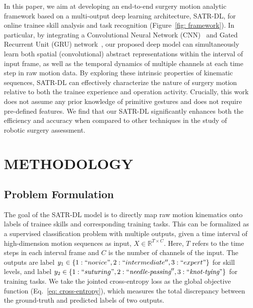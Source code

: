 \documentclass[letterpaper, 10 pt, conference, twoside]{IEEEtran}
\begin{document}
In this paper, we aim at developing an end-to-end surgery motion analytic framework based on a multi-output deep learning architecture, SATR-DL, for online trainee skill analysis and task recognition (Figure~\ref{fig: framework}). In particular, by integrating a Convolutional Neural Network (CNN)~\cite{szegedy2015going} and Gated Recurrent Unit (GRU) network~\cite{chung2014empirical}, our proposed deep model can simultaneously learn both spatial (convolutional) abstract representations within the interval of input frame, as well as the temporal dynamics of multiple channels at each time step in raw motion data.
By exploring these intrinsic properties of kinematic sequences, SATR-DL can effectively characterize the nature of surgery motion relative to both the trainee experience and operation activity. 
Crucially, this work does not assume any prior knowledge of primitive gestures and does not require pre-defined features.
We find that our SATR-DL significantly enhances both the efficiency and accuracy when compared to other techniques in the study of robotic surgery assessment.   
  
\section{METHODOLOGY}
\subsection{Problem Formulation}

The goal of the SATR-DL model is to directly map raw motion kinematics onto labels of trainee skills and corresponding training tasks. This can be formalized as a supervised classification problem with multiple outputs, given a time interval of high-dimension motion sequences as input, $X\in\mathbb{R}^{T\times C}$. Here, $T$ refers to the time steps in each interval frame and $C$ is the number of channels of the input. The outputs are label $y_1 \in \{1 :``novice", 2:``intermediate'', 3 :``expert" \}$ for skill levels, and label $y_2 \in \{1 :``suturing", 2:``\textit{needle-passing}'', 3 :``\textit{knot-tying}" \}$ for training tasks. 
We take the jointed cross-entropy loss as the global objective function (Eq.~\ref{eq: cross-entropy}), which measures the total discrepancy between the ground-truth and predicted labels of two outputs.

\vspace{-0.4cm}
\end{document}
